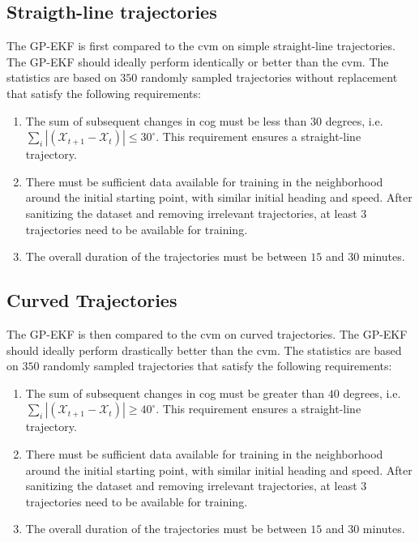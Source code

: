 \subsection{Straigth-line trajectories}
The GP-EKF is first compared to the \acrshort{cvm} on simple straight-line trajectories. The GP-EKF should ideally perform identically or better than the \acrshort{cvm}.
The statistics are based on $350$ randomly sampled trajectories without replacement that satisfy the following requirements:
\begin{enumerate}
    \item The sum of subsequent changes in \acrshort{cog} must be less than $30$ degrees, i.e. $\sum_i |(\mathcal{X}_{t+1} - \mathcal{X}_t)| \leq 30^\circ$. This requirement ensures a straight-line trajectory.
    \item There must be sufficient data available for training in the neighborhood around the initial starting point, with similar initial heading and speed. After sanitizing the dataset and removing irrelevant trajectories, at least $3$ trajectories need to be available for training.
    \item The overall duration of the trajectories must be between $15$ and $30$ minutes.
\end{enumerate}




\subsection{Curved Trajectories}
The GP-EKF is then compared to the \acrshort{cvm} on curved trajectories. The GP-EKF should ideally perform drastically better than the \acrshort{cvm}.
The statistics are based on $350$ randomly sampled trajectories that satisfy the following requirements:
\begin{enumerate}
    \item The sum of subsequent changes in \acrshort{cog} must be greater than $40$ degrees, i.e. $\sum_i |(\mathcal{X}_{t+1} - \mathcal{X}_t)| \geq 40^\circ$. This requirement ensures a straight-line trajectory.
    \item There must be sufficient data available for training in the neighborhood around the initial starting point, with similar initial heading and speed. After sanitizing the dataset and removing irrelevant trajectories, at least $3$ trajectories need to be available for training.
    \item The overall duration of the trajectories must be between $15$ and $30$ minutes.
\end{enumerate}

